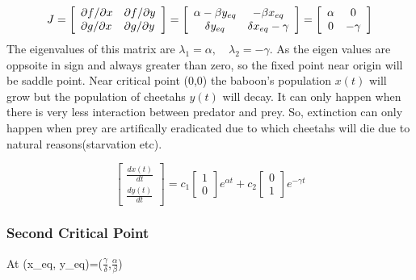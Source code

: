 \documentclass[12pt]{article}
\begin{document}
\begin{equation*}
J = \left[ \begin{array} { l l } \partial f / \partial x & \partial f / \partial y \\ \partial g / \partial x & \partial g / \partial y \end{array} \right] = \left[ \begin{array} { c c } \alpha - \beta y_{eq} & - \beta x_{eq} \\ \delta y_{eq} & \delta x_{eq} - \gamma \end{array} \right] = \left[ \begin{array} { c c } \alpha & 0 \\ 0 & - \gamma \end{array} \right]
    
\end{equation*}
The eigenvalues of this matrix are $ \lambda _ { 1 } = \alpha , \quad \lambda _ { 2 } = - \gamma $. As the eigen values are oppsoite in sign and always greater than zero, so the fixed point near origin will be saddle point. Near critical point (0,0) the baboon's population $ x ( t ) $ will grow but the population of cheetahs $y(t)$ will decay. It can only happen when there is very less interaction between predator and prey. So, extinction can only happen when prey are artifically eradicated due to which cheetahs will die due to natural reasons(starvation etc).

\begin{equation*}
    \left[\begin{array} { c } \frac { d x ( t ) } { d t } \\ \frac { d y ( t ) } { d t } \end{array} \right] = c _ { 1 } \left[ \begin{array} { l } 1 \\ 0 \end{array} \right] e ^ { \alpha t } + c _ { 2 } \left[ \begin{array} { l } 0 \\ 1 \end{array} \right] e ^ { - \gamma t } 
\end{equation*}
\subsubsection*{Second Critical Point}
At (x_{eq}, y_{eq})=($\frac{\gamma}{\delta}$,$\frac{\alpha}{\beta}$) \\
\end{document}
